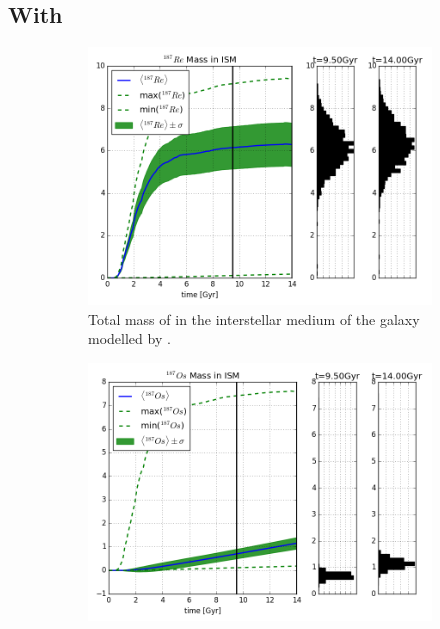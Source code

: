 \subsection{With \betadecay}
\begin{figure}
  \centering
  \begin{subfigure}{\subfigwidth}
    \includegraphics[width=\linewidth]{results/MCExperiment_revised_2/combined_plot_Re-187_decayed.png}
    \caption{\label{fig:MCExperiment-re187}
      Total mass of  in the interstellar medium of the galaxy modelled by \omegamodel.
    }
  \end{subfigure}
  \begin{subfigure}{\subfigwidth}
    \includegraphics[width=\linewidth]{results/MCExperiment_revised_2/combined_plot_Os-187_decayed.png}

\end{subfigure}
\end{figure}
